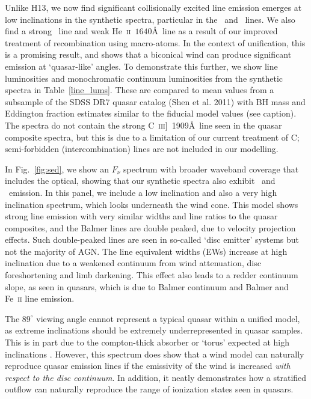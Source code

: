 \documentclass[useAMS,usenatbib]{mn2e_x}
\begin{document}
Unlike H13, we now find significant collisionally excited line emission emerges
at low inclinations in the synthetic spectra, particular in the \civ\ and \nv\
lines. We also find a strong \la\ line and weak He~\textsc{ii}~$1640$\AA\ line
as a result of our improved treatment of recombination using macro-atoms. 
In the context of unification, this is a promising result, 
and shows that a biconical wind can produce significant 
emission at `quasar-like' angles. To demonstrate this further,
we show line luminosities and monochromatic continuum luminosities
from the synthetic spectra in Table~\ref{line_lums}. These are compared to
mean values from a subsample of the SDSS DR7 quasar catalog (Shen et al. 2011) 
with BH mass and Eddington fraction estimates similar to the fiducial model values 
(see caption). The spectra do not contain the strong 
C~\textsc{iii}]~1909\AA\ line seen in the quasar composite spectra, 
but this is due to a limitation of our current treatment of C; semi-forbidden
(intercombination) lines are not included in our modelling.

In Fig.~\ref{fig:sed}, we show an $F_{\nu}$ spectrum with broader waveband coverage
that includes the optical, showing that our synthetic spectra 
also exhibit \ha\ and \hb\ emission. 
In this panel, we include a low inclination and 
also a very high inclination 
spectrum, which looks underneath the wind cone. This model shows 
strong line emission with very similar widths and line ratios to the quasar composites, and
the Balmer lines are double peaked, due to velocity projection effects.  
Such double-peaked lines are seen in so-called `disc emitter' systems 
\citep[e.g.][]{eracleous1994} but not the majority of AGN.     
The line equivalent widths (EWs) increase at high inclination
due to a weakened continuum from wind attenuation, 
disc foreshortening and limb darkening. This effect also 
leads to a redder continuum slope, as seen in quasars, which is
due to Balmer continuum and Balmer and Fe~\textsc{ii} line emission.

The $89^\circ$ viewing angle cannot represent a typical quasar within a unified model, as
extreme inclinations should be extremely underrepresented in quasar samples.
This is in part due to the compton-thick absorber or `torus' 
expected at high inclinations \cite[e.g.][]{antonucci1985,martinez2007}.
However, this spectrum does show that a wind model can
naturally reproduce quasar emission lines if the emissivity of the wind is 
increased {\em with respect to the disc continuum}.
In addition, it neatly demonstrates how a stratified outflow can naturally
reproduce the range of ionization states seen in quasars.
\end{document}
